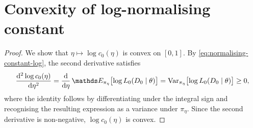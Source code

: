 \section{Convexity of log-normalising constant}
\label{proof:log-c0-convex}

\begin{proof}
We show that $\eta \mapsto \log c_0(\eta)$ is convex on $[0,1]$.
By \eqref{eq:normalising-constant-log}, the second derivative satisfies
\begin{equation}
    \dv[2]{\log c_0(\eta)}{\eta}
    =
    \dv{}{\eta}\, \bE_{\pi_\eta}\bigl[\log L_0(D_0 \mid \theta)\bigr]
    =
    \mathrm{Var}_{\pi_\eta}\bigl[\log L_0(D_0 \mid \theta)\bigr]
    \geq
    0,
\end{equation}
where the identity follows by differentiating under the integral sign and recognising the resulting expression as a variance under $\pi_\eta$.
Since the second derivative is non-negative, $\log c_0(\eta)$ is convex.
\end{proof}